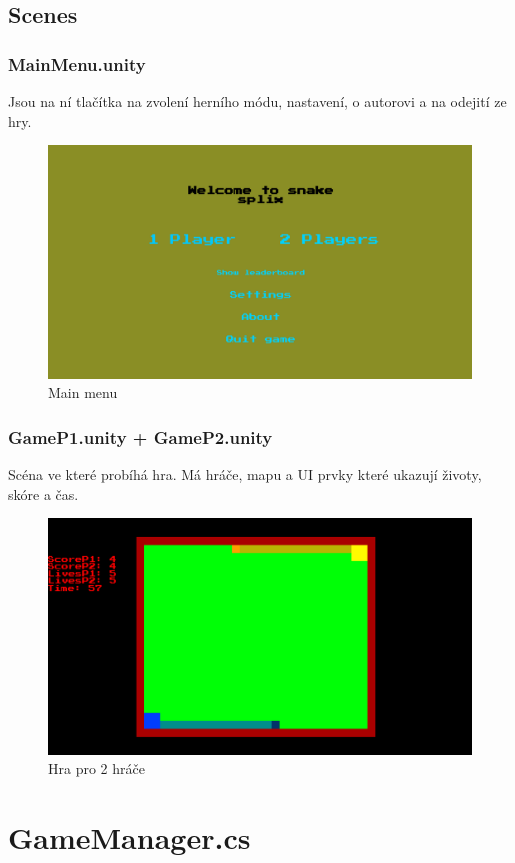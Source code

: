 \documentclass[12pt,a4paper]{report}
\begin{document}
\newpage
\section{Scenes}
\subsection{MainMenu.unity}
Jsou na ní tlačítka na zvolení herního módu, nastavení, o autorovi a na odejití ze hry.

\begin{figure}[H]\centering
    \includegraphics[width=.9\textwidth]{images/main_menu.png}
    \caption{Main menu}
\end{figure}
\subsection{GameP1.unity + GameP2.unity}
Scéna ve které probíhá hra. Má hráče, mapu a UI prvky které ukazují životy, skóre a čas.
\begin{figure}[H]\centering
    \includegraphics[width=.9\textwidth]{images/game.png}
    \caption{Hra pro 2 hráče}
\end{figure}
\chapter{GameManager.cs}
\label{sec:gamemanager}
\end{document}

